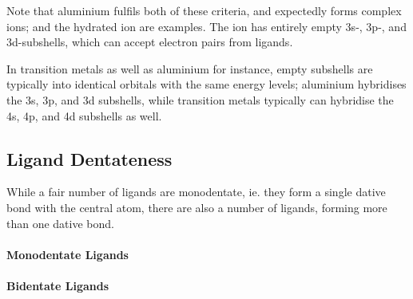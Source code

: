 			Note that aluminium fulfils both of these criteria, and expectedly forms complex ions; \ch{[\Al(OH)4]-} and the hydrated ion
			 are examples. The  ion has entirely empty 3s-, 3p-, and 3d-subshells, which can accept electron
			pairs from ligands.

			In transition metals as well as aluminium for instance, empty subshells are typically  into identical orbitals with
			the same energy levels; aluminium hybridises the 3s, 3p, and 3d subshells, while transition metals typically can hybridise the
			4s, 4p, and 4d subshells as well.



		\subsection{Ligand Dentateness}

			While a fair number of ligands are monodentate, ie. they form a single dative bond with the central atom, there are also a number
			of  ligands, forming more than one dative bond.

			\paragraph{Monodentate Ligands}


			\paragraph{Bidentate Ligands}



